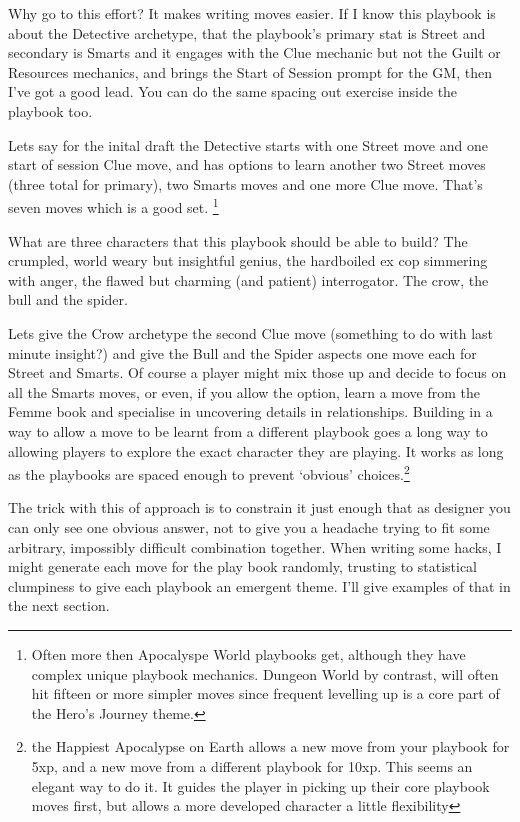 \documentclass{tufte-handout}
\begin{document}
Why go to this effort? It makes writing moves easier. If I know this playbook is about the Detective archetype, that the playbook's primary stat is Street and secondary is Smarts and it engages with the Clue mechanic but not the Guilt or Resources mechanics, and brings the Start of Session prompt for the GM, then I've got a good lead. You can do the same spacing out exercise inside the playbook too. 

Lets say for the inital draft the Detective starts with one Street move and one start of session Clue move, and has options to learn another two Street moves (three total for primary), two Smarts moves and one more Clue move. That's seven moves which is a good set. \footnote{ Often more then Apocalyspe World playbooks get, although they have complex unique playbook mechanics. Dungeon World by contrast, will often hit fifteen or more simpler moves since frequent levelling up is a core part of the Hero's Journey theme.}

What are three characters that this playbook should be able to build? The crumpled, world weary but insightful genius, the hardboiled ex cop simmering with anger, the flawed but charming (and patient) interrogator. The crow, the bull and the spider.

Lets give the Crow archetype the second Clue move (something to do with last minute insight?) and give the Bull and the Spider aspects one move each for Street and Smarts. Of course a player might mix those up and decide to focus on all the Smarts moves, or even, if you allow the option, learn a move from the Femme book and specialise in uncovering details in relationships. Building in a way to allow a move to be learnt from a different playbook goes a long way to allowing players to explore the exact character they are playing. It works as long as the playbooks are spaced enough to prevent `obvious' choices.\footnote{the Happiest Apocalypse on Earth allows a new move from your playbook for 5xp, and a new move from a different playbook for 10xp. This seems an elegant way to do it. It guides the player in picking up their core playbook moves first, but allows a more developed character a little flexibility}
 
The trick with this of approach is to constrain it just enough that as designer you can only see one obvious answer, not to give you a headache trying to fit some arbitrary, impossibly difficult combination together. 
When writing some hacks, I might generate each move for the play book randomly, trusting to statistical clumpiness to give each playbook an emergent theme. I'll give examples of that in the next section.
 
\end{document}
